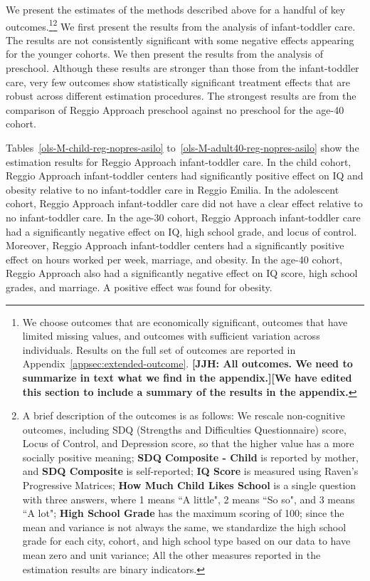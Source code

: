 We present the estimates of the methods described above for a handful of key outcomes.\footnote{We choose outcomes that are economically significant,  outcomes that have limited missing values, and outcomes with sufficient variation across individuals. Results on the full set of outcomes are reported in Appendix~\ref{appsec:extended-outcome}. \textbf{[JJH: All outcomes. We need to summarize in text what we find in the appendix.][We have edited this section to include a summary of the results in the appendix.}}\footnote{A brief description of the outcomes is as follows: We rescale non-cognitive outcomes, including SDQ (Strengths and Difficulties Questionnaire) score, Locus of Control, and Depression score, so that the higher value has a more socially positive meaning; \textbf{SDQ Composite - Child} is reported by mother, and \textbf{SDQ Composite} is self-reported; \textbf{IQ Score} is measured using Raven's Progressive Matrices; \textbf{How Much Child Likes School} is a single question with three answers, where 1 means ``A little", 2 means ``So so", and 3 means ``A lot";  \textbf{High School Grade} has the maximum scoring of 100; since the mean and variance is not always the same, we standardize the high school grade for each city, cohort, and high school type based on our data to have mean zero and unit variance; All the other measures reported in the estimation results are binary indicators.} We first present the results from the analysis of infant-toddler care. The results are not consistently significant with some negative effects appearing for the younger cohorts. We then present the results from the analysis of preschool. Although these results are stronger than those from the infant-toddler care, very few outcomes show statistically significant treatment effects that are robust across different estimation procedures. The strongest results are from the comparison of Reggio Approach preschool against no preschool for the age-40 cohort. 

Tables~\ref{ols-M-child-reg-nopres-asilo} to~\ref{ols-M-adult40-reg-nopres-asilo} show the estimation results for Reggio Approach infant-toddler care. In the child cohort, Reggio Approach infant-toddler centers had significantly positive effect on IQ and obesity relative to no infant-toddler care in Reggio Emilia. In the adolescent cohort, Reggio Approach infant-toddler care did not have a clear effect relative to no infant-toddler care. In the age-30 cohort, Reggio Approach infant-toddler care had a significantly negative effect on IQ, high school grade, and locus of control. Moreover, Reggio Approach infant-toddler centers had a significantly positive effect on hours worked per week, marriage, and obesity. In the age-40 cohort, Reggio Approach also had a significantly negative effect on IQ score, high school grades, and marriage. A positive effect was found for obesity. 

